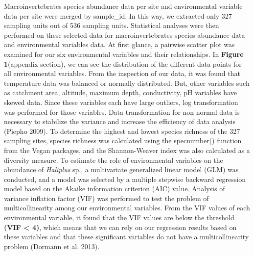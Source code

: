 \documentclass[
]{article}
\begin{document}
Macroinvertebrates species abundance data per site and environmental
variable data per site were merged by sample\_id. In this way, we
extracted only 327 sampling units out of 536 sampling units. Statistical
analyses were then performed on these selected data for
macroinvertebrates species abundance data and environmental variables
data. At first glance, a pairwise scatter plot was examined for our six
environmental variables and their relationships. In \textbf{Figure
1}(appendix section), we can see the distribution of the different data
points for all environmental variables. From the inspection of our data,
it was found that temperature data was balanced or normally distributed.
But, other variables such as catchment area, altitude, maximum depth,
conductivity, pH variables have skewed data. Since these variables each
have large outliers, log transformation was performed for those
variables. Data transformation for non-normal data is necessary to
stabilize the variance and increase the efficiency of data analysis
(Piepho 2009). To determine the highest and lowest species richness of
the 327 sampling sites, species richness was calculated using the
specnumber() function from the Vegan packages, and the Shannon-Weaver
index was also calculated as a diversity measure. To estimate the role
of environmental variables on the abundance of \emph{Haliplus} sp., a
multivariate generalized linear model (GLM) was conducted, and a model
was selected by a multiple stepwise backward regression model based on
the Akaike information criterion (AIC) value. Analysis of variance
inflation factor (VIF) was performed to test the problem of
multicollinearity among our environmental variables. From the VIF values
of each environmental variable, it found that the VIF values are below
the threshold \textbf{(VIF \textless{} 4)}, which means that we can rely
on our regression results based on these variables and that these
significant variables do not have a multicollinearity problem (Dormann
et al. 2013).
\end{document}
